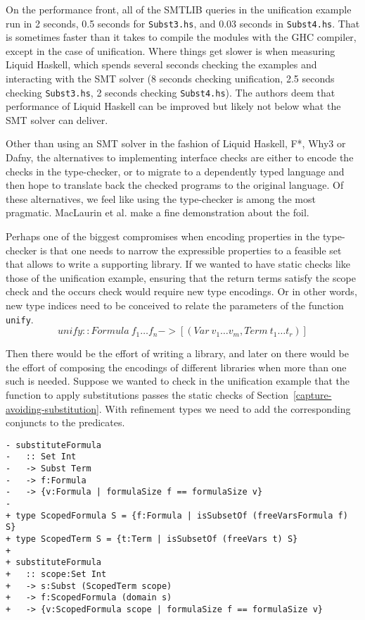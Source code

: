 \documentclass[acmtog, anonymous]{acmart}
\newcommand{\tc}[1]{{\small\texttt{#1}}}
\begin{document}
On the performance front, all of the SMTLIB queries in the unification example run
in 2 seconds, 0.5 seconds for \tc{Subst3.hs}, and 0.03 seconds in \tc{Subst4.hs}.
That is sometimes faster than it takes to compile the modules with the GHC compiler,
except in the case of unification. Where things get slower is when measuring Liquid
Haskell, which spends several seconds checking the examples and interacting with the
SMT solver (8 seconds checking unification, 2.5 seconds checking \tc{Subst3.hs},
2 seconds checking \tc{Subst4.hs}). The authors deem that performance of Liquid Haskell
can be improved but likely not below what the SMT solver can deliver.

Other than using an SMT solver in the fashion of Liquid Haskell, F*, Why3 or Dafny,
the alternatives to implementing interface checks are either to encode the checks in
the type-checker, or to migrate to a dependently typed language and then hope to
translate back the checked programs to the original language. Of these alternatives,
we feel like using the type-checker is among the most pragmatic. MacLaurin et al. make
a fine demonstration about the foil.

Perhaps one of the biggest compromises when encoding properties in the type-checker
is that one needs to narrow the expressible properties to a feasible set that allows
to write a supporting library. If we wanted to have static checks like those of the
unification example, ensuring that the return terms satisfy the scope check and the
occurs check would require new type encodings. Or in other words, new type indices
need to be conceived to relate the parameters of the function \tc{unify}.
$$\mathit{unify} :: \mathit{Formula}\ f_1 \ldots f_n -> [(\mathit{Var}\ v_1 \ldots v_m, \mathit{Term}\ t_1 \ldots t_r)]$$

Then there would be the effort of writing a library, and later on there would be the
effort of composing the encodings of different libraries when more than one such
is needed. Suppose we wanted to check in the unification example that the
function to apply substitutions passes the static checks of
Section~\ref{capture-avoiding-substitution}. With
refinement types we need to add the corresponding conjuncts to the predicates.

\begin{verbatim}
- substituteFormula
-   :: Set Int
-   -> Subst Term
-   -> f:Formula
-   -> {v:Formula | formulaSize f == formulaSize v}
-
+ type ScopedFormula S = {f:Formula | isSubsetOf (freeVarsFormula f) S}
+ type ScopedTerm S = {t:Term | isSubsetOf (freeVars t) S}
+
+ substituteFormula
+   :: scope:Set Int
+   -> s:Subst (ScopedTerm scope)
+   -> f:ScopedFormula (domain s)
+   -> {v:ScopedFormula scope | formulaSize f == formulaSize v}
\end{verbatim}
\end{document}
